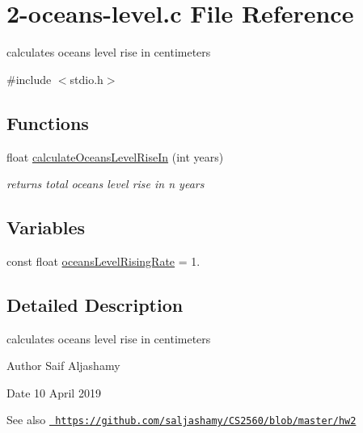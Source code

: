 \hypertarget{2-oceans-level_8c}{}\section{2-\/oceans-\/level.c File Reference}
\label{2-oceans-level_8c}


calculates ocean\textquotesingle{}s level rise in centimeters  


{\ttfamily \#include $<$stdio.\+h$>$}\newline
\subsection*{Functions}
\begin{DoxyCompactItemize}
\item 
float \mbox{\hyperlink{2-oceans-level_8c_a9602c30389ac63e210b47529ea1a2d37}{calculate\+Oceans\+Level\+Rise\+In}} (int years)
\begin{DoxyCompactList}\small\item\em returns total ocean\textquotesingle{}s level rise in n {\ttfamily years} \end{DoxyCompactList}\end{DoxyCompactItemize}
\subsection*{Variables}
\begin{DoxyCompactItemize}
\item 
const float \mbox{\hyperlink{2-oceans-level_8c_a33573c5468ab3fec6358ca61e129e14e}{oceans\+Level\+Rising\+Rate}} = 1.
\end{DoxyCompactItemize}


\subsection{Detailed Description}
calculates ocean\textquotesingle{}s level rise in centimeters 

\begin{DoxyAuthor}{Author}
Saif Aljashamy 
\end{DoxyAuthor}
\begin{DoxyDate}{Date}
10 April 2019 
\end{DoxyDate}
\begin{DoxySeeAlso}{See also}
\href{https://github.com/saljashamy/CS2560/blob/master/hw2}{\texttt{ https\+://github.\+com/saljashamy/\+C\+S2560/blob/master/hw2}} 
\end{DoxySeeAlso}


